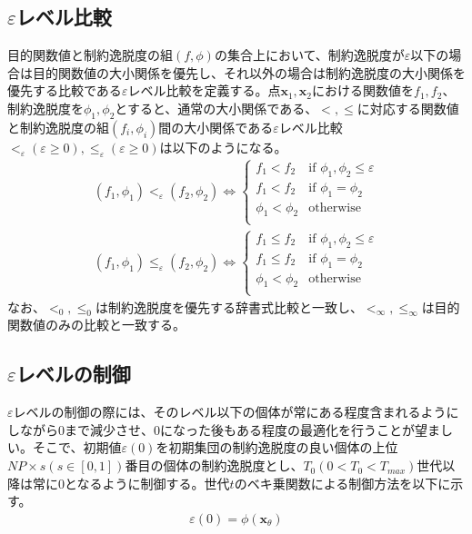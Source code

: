 \documentclass[a4paper,12pt]{jsreport}
\begin{document}
\subsection{$\varepsilon$レベル比較}
目的関数値と制約逸脱度の組$(f,\phi)$の集合上において、制約逸脱度が$\varepsilon$以下の場合は目的関数値の大小関係を優先し、それ以外の場合は制約逸脱度の大小関係を優先する比較である$\varepsilon$レベル比較を定義する。点$\bm{x}_1,\bm{x}_2$における関数値を${f}_1,{f}_2$、制約逸脱度を${\phi}_1,{\phi}_2$とすると、通常の大小関係である、$<,\leq$に対応する関数値と制約逸脱度の組$({f}_i,{\phi}_i)$間の大小関係である$\varepsilon$レベル比較${<}_\varepsilon(\varepsilon \geq 0),{\leq}_\varepsilon(\varepsilon \geq 0)$は以下のようになる。
\begin{eqnarray}
({f}_1,{\phi}_1){<}_\varepsilon({f}_2,{\phi}_2)
\Leftrightarrow
\left\{
\begin{array}{cc}
    {f}_1<{f}_2 & \mbox{if ${\phi}_1,{\phi}_2 \leq \varepsilon$}\\
    {f}_1<{f}_2 & \mbox{if ${\phi}_1={\phi}_2$}\\
    {\phi}_1<{\phi}_2 & \mbox{otherwise}\\
\end{array}
\right.
\end{eqnarray}
\begin{eqnarray}
({f}_1,{\phi}_1){\leq}_\varepsilon({f}_2,{\phi}_2)
\Leftrightarrow
\left\{
\begin{array}{cc}
    {f}_1\leq{f}_2 & \mbox{if ${\phi}_1,{\phi}_2 \leq \varepsilon$}\\
    {f}_1\leq{f}_2 & \mbox{if ${\phi}_1={\phi}_2$}\\
    {\phi}_1<{\phi}_2 & \mbox{otherwise}\\
\end{array}
\right.
\end{eqnarray}
なお、${<}_0,{\leq}_0$は制約逸脱度を優先する辞書式比較と一致し、${<}_∞,{\leq}_∞$は目的関数値のみの比較と一致する。


\subsection{$\varepsilon$レベルの制御}
$\varepsilon$レベルの制御の際には、そのレベル以下の個体が常にある程度含まれるようにしながら0まで減少させ、0になった後もある程度の最適化を行うことが望ましい\cite{εレベル制御}。そこで、初期値$\varepsilon(0)$を初期集団の制約逸脱度の良い個体の上位$NP×s(s\in [0,1])$番目の個体の制約逸脱度とし、${T}_0(0<{T}_0<{T}_{max})$世代以降は常に0となるように制御する。世代$t$のベキ乗関数による制御方法を以下に示す。
\begin{eqnarray}
{\varepsilon}(0)=\phi(\bm{x}_\theta)
\end{eqnarray}
\end{document}
